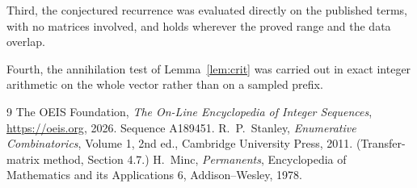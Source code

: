\documentclass[11pt,a4paper]{article}
\theoremstyle{plain}
\theoremstyle{definition}
\begin{document}
Third, the conjectured recurrence was evaluated directly on the published terms, with no
matrices involved, and holds wherever the proved range and the data overlap.

Fourth, the annihilation test of Lemma~\ref{lem:crit} was carried out in exact integer
arithmetic on the whole vector rather than on a sampled prefix.

\begin{thebibliography}{9}
 The OEIS Foundation, \emph{The On-Line Encyclopedia of Integer
Sequences}, \url{https://oeis.org}, 2026. Sequence A189451.
 R.~P.~Stanley, \emph{Enumerative Combinatorics}, Volume 1, 2nd ed.,
Cambridge University Press, 2011. (Transfer-matrix method, Section 4.7.)
 H.~Minc, \emph{Permanents}, Encyclopedia of Mathematics and its
Applications 6, Addison--Wesley, 1978.
\end{thebibliography}
\end{document}
